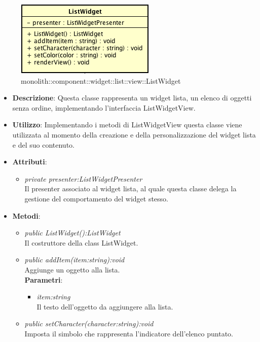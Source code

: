 \label{monolith::component::widget::list::view::ListWidget}
\begin{figure}[H]
	\centering
	\includegraphics[scale=0.5]{Sezioni/SottosezioniST/img/ListWidget.png}
	\caption{monolith::component::widget::list::view::ListWidget}
\end{figure}

\begin{itemize}
\item \textbf{Descrizione}: Questa classe rappresenta un widget lista, un elenco di oggetti senza ordine, implementando l'interfaccia ListWidgetView.
\item \textbf{Utilizzo}: Implementando i metodi di ListWidgetView questa classe viene utilizzata al momento della creazione e della personalizzazione del widget lista e del suo contenuto.
\item \textbf{Attributi}:
	\begin{itemize}
	\item \textit{private presenter:ListWidgetPresenter}\\
	Il presenter associato al widget lista, al quale questa classe delega la gestione del comportamento del widget stesso.
	\end{itemize}
\item \textbf{Metodi}:
	\begin{itemize}
	\item \textit{public ListWidget():ListWidget}\\
	Il costruttore della class ListWidget.
	\item \textit{public addItem(item:string):void}\\
	Aggiunge un oggetto alla lista.
		\\ \textbf{Parametri}: \begin{itemize}
		\item \textit{item:string}\\
		Il testo dell'oggetto da aggiungere alla lista.
		\end{itemize} 
	\item \textit{public setCharacter(character:string):void}\\
	Imposta il simbolo che rappresenta l'indicatore dell'elenco puntato.

\end{itemize}
\end{itemize}
